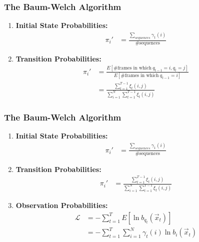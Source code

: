 \documentclass{beamer}
\begin{document}
\begin{frame}
  \frametitle{The Baum-Welch Algorithm}

  \begin{enumerate}
  \item {\bf Initial State Probabilities:}
    \begin{align*}
      \pi_i'  &=\frac{\sum_{sequences} \gamma_1(i)}{\mbox{\# sequences}}
    \end{align*}
  \item {\bf Transition Probabilities:}
    \begin{align*}
      \pi_i'&=\frac{E\left[\mbox{\# frames in which}~q_{t-1}=i,q_t=j\right]}{E\left[\mbox{\# frames in which}~q_{t-1}=i\right]}\\
      &=\frac{\sum_{t=1}^{T-1} \xi_t(i,j)}{\sum_{i=1}^N\sum_{t=1}^{T-1}\xi_t(i,j)}
    \end{align*}
  \end{enumerate}
\end{frame}

\begin{frame}
  \frametitle{The Baum-Welch Algorithm}

  \begin{enumerate}
  \item {\bf Initial State Probabilities:}
    \begin{align*}
      \pi_i' &=\frac{\sum_{sequences} \gamma_1(i)}{\mbox{\# sequences}}
    \end{align*}
  \item {\bf Transition Probabilities:}
    \begin{align*}
      \pi_i' &=\frac{\sum_{t=1}^{T-1} \xi_t(i,j)}{\sum_{i=1}^N\sum_{t=1}^{T-1}\xi_t(i,j)}
    \end{align*}
  \item {\bf Observation Probabilities:} 
    \begin{align*}
      {\mathcal L} &= -\sum_{t=1}^T E\left[\ln b_{q_t}(\vec{x}_t)\right]\\
      &= -\sum_{t=1}^T\sum_{i=1}^N  \gamma_t(i)\ln b_{i}(\vec{x}_t)
    \end{align*}
  \end{enumerate}
\end{frame}
\end{document}
